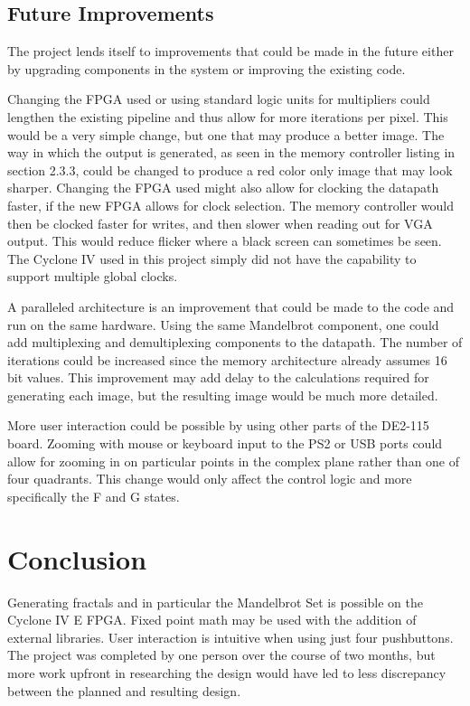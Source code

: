 \documentclass[titlepage]{article}      %
\begin{document}
\subsection{Future Improvements}
The project lends itself to improvements that could be made in the future either by upgrading components in the system or improving the existing code.

Changing the FPGA used or using standard logic units for multipliers could lengthen the existing pipeline and thus allow for more iterations per pixel. This would be a very simple change, but one that may produce a better image. The way in which the output is generated, as seen in the memory controller listing in section 2.3.3, could be changed to produce a red color only image that may look sharper. Changing the FPGA used might also allow for clocking the datapath faster, if the new FPGA allows for clock selection. The memory controller would then be clocked faster for writes, and then slower when reading out for VGA output. This would reduce flicker where a black screen can sometimes be seen. The Cyclone IV used in this project simply did not have the capability to support multiple global clocks.

A paralleled architecture is an improvement that could be made to the code and run on the same hardware. Using the same Mandelbrot component, one could add multiplexing and demultiplexing components to the datapath. The number of iterations could be increased since the memory architecture already assumes 16 bit values. This improvement may add delay to the calculations required for generating each image, but the resulting image would be much more detailed.

More user interaction could be possible by using other parts of the DE2-115 board. Zooming with mouse or keyboard input to the PS2 or USB ports could allow for zooming in on particular points in the complex plane rather than one of four quadrants. This change would only affect the control logic and more specifically the F and G states.

\section{Conclusion}
Generating fractals and in particular the Mandelbrot Set is possible on the Cyclone IV E FPGA. Fixed point math may be used with the addition of external libraries. User interaction is intuitive when using just four pushbuttons. The project was completed by one person over the course of two months, but more work upfront in researching the design would have led to less discrepancy between the planned and resulting design. 
\end{document}
